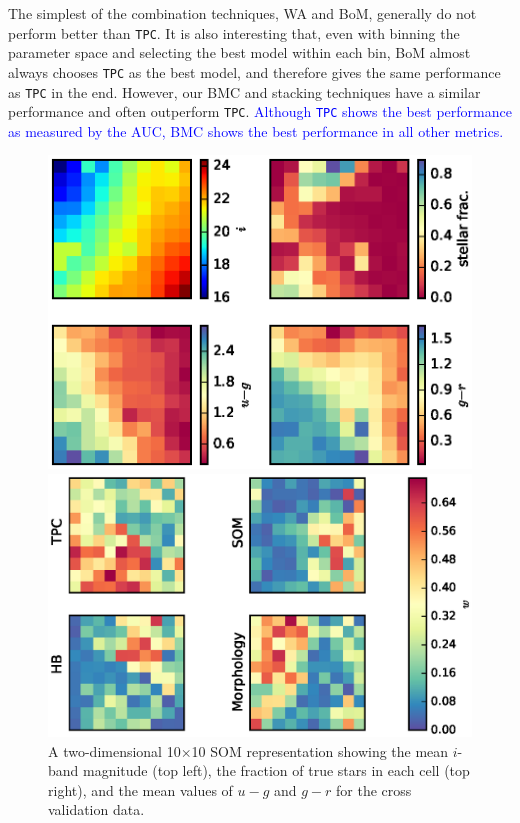\documentclass[useAMS,usenatbib]{mn2e}
\begin{document}
The simplest of the combination techniques, WA and BoM,
generally do not perform better than \texttt{TPC}.
It is also interesting that,
even with binning the parameter space and selecting the best model
within each bin,
BoM almost always chooses \texttt{TPC} as the best model,
and therefore gives the same performance as \texttt{TPC} in the end.
However, our BMC and stacking techniques have a similar performance
and often outperform \texttt{TPC}.
\textcolor{blue}{
Although \texttt{TPC} shows the best performance as measured by the AUC,
BMC shows the best performance in all other metrics.
}

\begin{figure}
  \begin{minipage}[t]{0.49\linewidth}
    \includegraphics[width=\textwidth]{figures/som_colors.eps}
    \caption{A two-dimensional 10$\times$10 SOM representation
             showing the mean $i$-band magnitude (top left),
             the fraction of true stars in each cell (top right),
             and the mean values of $u-g$ and $g-r$
             for the cross validation data.}
    \label{fig:som_colors}
  \end{minipage}
  \hfill
  \begin{minipage}[t]{0.49\linewidth}
    \includegraphics[width=\textwidth]{figures/weights.eps}

\end{minipage}
\end{figure}
\end{document}
